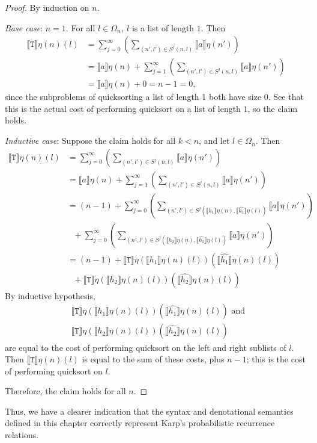 \begin{proof}
By induction on $n$.

\emph{Base case}: $n = 1$.  For all $l \in \Omega_n, \ l$ is a list of length $1$. Then
\begin{align*}
\llbracket \texttt{T} \rrbracket\eta (n)(l) &=  \sum_{j=0}^{\infty}(\sum_{(n',l') \in S^j(n,l)} \llbracket a \rrbracket\eta(n')) \\
&= \llbracket a \rrbracket\eta(n) + \sum_{j=1}^{\infty}(\sum_{(n',l') \in S^j(n,l)} \llbracket a \rrbracket\eta(n')) \\
&= \llbracket a \rrbracket\eta(n) + 0 = n - 1 = 0,
\end{align*}
since the subproblems of quicksorting a list of length 1 both have size $0$. See that this is the actual cost of performing
quicksort on a list of length $1$, so the claim holds.

\emph{Inductive case}: Suppose the claim holds for all $k < n$, and let $l \in \Omega_n$. Then
\begin{align*}
 \llbracket \texttt{T} \rrbracket\eta (n)(l) &=  \sum_{j=0}^{\infty}(\sum_{(n',l') \in S^j(n,l)} \llbracket a \rrbracket\eta(n')) \\
 &= \llbracket a \rrbracket\eta(n) + \sum_{j=1}^{\infty}(\sum_{(n',l') \in S^j(n,l)} \llbracket a \rrbracket\eta(n')) \\
&= (n-1) + \sum_{j=0}^{\infty}(\sum_{(n',l') \in S^j(\llbracket h_1 \rrbracket\eta(n),
\llbracket \hat{h_1} \rrbracket \eta(l))} \llbracket a \rrbracket\eta(n')) \\
 & \text{ \ \ \ \ \ \ \ \ \ \ \ \ } + \sum_{j=0}^{\infty}(\sum_{(n',l') \in S^j(\llbracket h_2 \rrbracket \eta(n),
 \llbracket \hat{h_2} \rrbracket \eta(l))} \llbracket a \rrbracket\eta(n')) \\
 &= (n-1) + \llbracket \texttt{T} \rrbracket\eta(\llbracket h_1 \rrbracket\eta(n)(l))(\llbracket \hat{h_1} \rrbracket\eta(n)(l)) \\
 &\text{ \ \ \ \ \ \ \ \ \ \ \ \ }+  \llbracket \texttt{T} \rrbracket\eta(\llbracket h_2 \rrbracket\eta(n)(l))(\llbracket \hat{h_2} \rrbracket\eta(n)(l))  
\end{align*}
By inductive hypothesis, 
\begin{align*}
&\llbracket \texttt{T} \rrbracket\eta(\llbracket h_1 \rrbracket\eta(n)(l))(\llbracket \hat{h_1} \rrbracket\eta(n)(l)) \text{ and } \\
&\llbracket \texttt{T} \rrbracket\eta(\llbracket h_2 \rrbracket\eta(n)(l))(\llbracket \hat{h_2} \rrbracket\eta(n)(l))
\end{align*}
 are equal
to the cost of performing quicksort on the left and right sublists of $l$. Then $\llbracket \texttt{T} \rrbracket\eta (n)(l)$ is equal 
to the sum of these costs, plus $n-1$; this is the cost of performing quicksort on $l$.

Therefore, the claim holds for all $n$.
\end{proof}
Thus, we have a clearer indication that the syntax and denotational semantics defined in this chapter correctly 
represent Karp's probabilistic recurrence relations.

